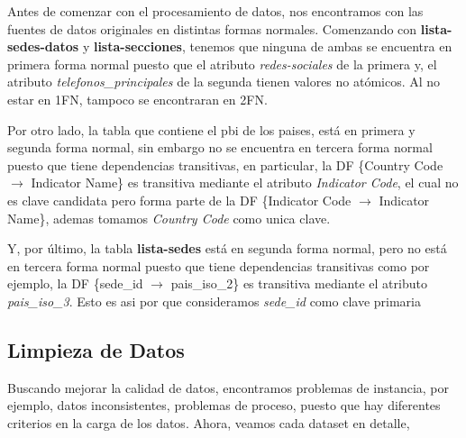 \documentclass[10pt,a4paper]{article}
\begin{document}
Antes de comenzar con el procesamiento de datos, nos encontramos con las fuentes de datos originales en distintas formas normales. Comenzando con \textbf{lista-sedes-datos} y \textbf{lista-secciones}, tenemos que ninguna de ambas se encuentra en primera forma normal puesto que el atributo \textit{redes-sociales} de la primera y, el atributo \textit{telefonos\_principales} de la segunda tienen valores no atómicos. Al no estar en 1FN, tampoco se encontraran en 2FN. \par
Por otro lado, la tabla que contiene el pbi de los paises, está en primera y segunda forma normal, sin embargo no se encuentra en tercera forma normal puesto que tiene dependencias transitivas, en particular, la DF \{Country Code $\rightarrow$ Indicator Name\} es transitiva mediante el atributo \textit{Indicator Code}, el cual no es clave candidata pero forma parte de la DF \{Indicator Code $\rightarrow$ Indicator Name\}, ademas tomamos \textit{Country Code} como unica clave.  \par
Y, por último, la tabla \textbf{lista-sedes} está en segunda forma normal, pero no está en tercera forma normal puesto que tiene dependencias transitivas como por ejemplo, la DF \{sede\_id $\rightarrow$ pais\_iso\_2\} es transitiva mediante el atributo \textit{pais\_iso\_3}. Esto es asi por que consideramos \textit{sede\_id} como clave primaria

\subsection{Limpieza de Datos}

Buscando mejorar la calidad de datos, encontramos problemas de instancia, por ejemplo, datos inconsistentes, problemas de 
proceso, puesto que hay diferentes criterios en la carga de los datos. Ahora, veamos cada dataset en detalle,
\end{document}
